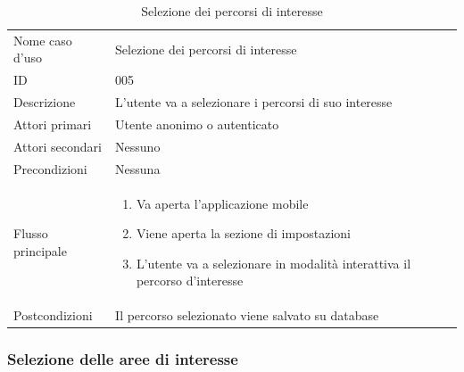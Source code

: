 \documentclass{article}
\begin{document}
\begin{table}[htbp]
    \centering
    \begin{tabularx}{\textwidth}{| l | p{} |}
        \Xhline{2pt} %
        Nome caso d'uso & Selezione dei percorsi di interesse \\
        \Xhline{2pt} %
        ID & 005 \\
        \hline
        Descrizione & L'utente va a selezionare i percorsi di suo interesse\\
        \hline
        Attori primari & Utente anonimo o autenticato\\
        \hline
        Attori secondari & Nessuno \\
        \hline
        Precondizioni & Nessuna \\
        \hline
        Flusso principale & 
        \begin{enumerate}[topsep=5pt,partopsep=0pt,parsep=0pt,itemsep=0pt,before=\vspace{-\baselineskip},after=\vspace{-\baselineskip}]                
            \item Va aperta l'applicazione mobile
            \item Viene aperta la sezione di impostazioni
            \item L'utente va a selezionare in modalità interattiva il percorso d'interesse
        \end{enumerate}
        \\
        \hline
        Postcondizioni & Il percorso selezionato viene salvato su database \\
        \hline
    \end{tabularx}
    \caption{Selezione dei percorsi di interesse}
    \label{tab:tabella_use_case004}
\end{table}

\clearpage

\subsubsection{Selezione delle aree di interesse}
\end{document}

